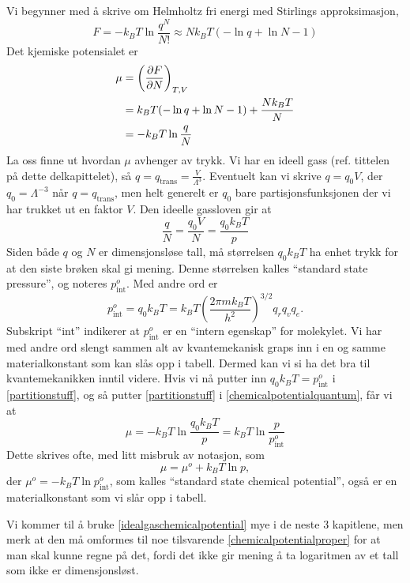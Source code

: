Vi begynner med å skrive om Helmholtz fri energi med Stirlings approksimasjon,
\begin{equation}
	F=-k_BT\ln\frac{q^N}{N!}\approx Nk_BT(-\ln q + \ln N - 1)
\end{equation}
Det kjemiske potensialet er
\begin{align}\label{chemicalpotentialquantum}\begin{split}
	\mu &= \left(\frac{\partial F}{\partial N}\right)_{T,V}\\ 
	&=k_BT(-\ln q + \ln N - 1) + \frac{Nk_BT}{N} \\
	&=-k_BT\ln\frac{q}{N}
\end{split}\end{align}
La oss finne ut hvordan $\mu$ avhenger av trykk. Vi har en ideell gass (ref. tittelen på dette delkapittelet), så $q=q_{\text{trans}}=\frac{V}{\Lambda^3}$. Eventuelt kan vi skrive $q=q_0V$, der $q_0=\Lambda^{-3}$ når $q=q_{\text{trans}}$, men helt generelt er $q_0$ bare partisjonsfunksjonen der vi har trukket ut en faktor $V$. Den ideelle gassloven gir at
\begin{equation}
	\label{partitionstuff}
 	\frac{q}{N}=\frac{q_0V}{N}=\frac{q_0k_BT}{p}
\end{equation} 
Siden både $q$ og $N$ er dimensjonsløse tall, må størrelsen $q_0k_BT$ ha enhet trykk for at den siste brøken skal gi mening. Denne størrelsen kalles ``standard state pressure'', og noteres $p_{\text{int}}^o$. Med andre ord er
\begin{equation}
	p_{\text{int}}^o=q_0k_BT=k_BT\left(\frac{2\pi m k_BT}{h^2}\right)^{3/2}q_rq_vq_e.
\end{equation}
Subskript ``int'' indikerer at $p_{\text{int}}^o$ er en ``intern egenskap'' for molekylet. Vi har med andre ord slengt sammen alt av kvantemekanisk graps inn i en og samme materialkonstant som kan slås opp i tabell. Dermed kan vi si ha det bra til kvantemekanikken inntil videre. Hvis vi nå putter inn $q_0k_BT=p_{\text{int}}^o$ i \eqref{partitionstuff}, og så putter \eqref{partitionstuff} i \eqref{chemicalpotentialquantum}, får vi at
\begin{equation}
	\label{chemicalpotentialproper}
	\mu = -k_BT\ln\frac{q_0k_BT}{p}=k_BT\ln \frac{p}{p_{\text{int}}^o}
\end{equation}
Dette skrives ofte, med litt misbruk av notasjon, som
\begin{equation}
	\label{idealgaschemicalpotential}
	\mu = \mu^o + k_BT\ln p,
\end{equation}
der $\mu^o=-k_BT\ln p_{\text{int}}^o$, som kalles ``standard state chemical potential'', også er en materialkonstant som vi slår opp i tabell.

Vi kommer til å bruke \eqref{idealgaschemicalpotential} mye i de neste 3 kapitlene, men merk at den må omformes til noe tilsvarende \eqref{chemicalpotentialproper} for at man skal kunne regne på det, fordi det ikke gir mening å ta logaritmen av et tall som ikke er dimensjonsløst.
